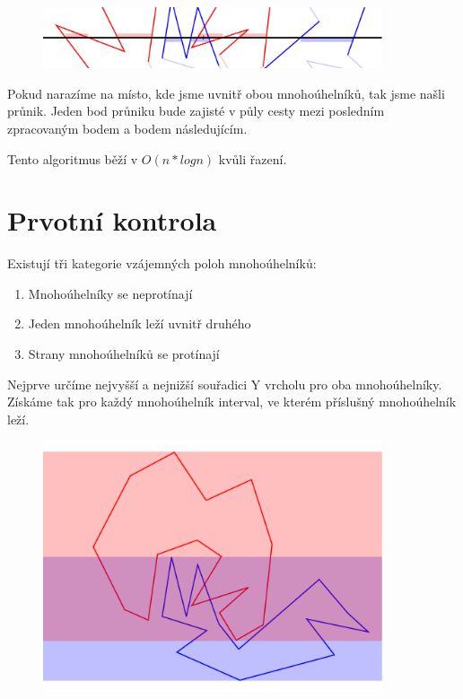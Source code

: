 \documentclass{article}
\begin{document}
\begin{figure}[h] \centering
    \includegraphics[width=10cm]{images/on-line.001.pdf}
\end{figure}

Pokud narazíme na místo, kde jsme uvnitř obou mnohoúhelníků, tak jsme našli průnik. Jeden bod průniku bude zajisté v půly cesty mezi posledním zpracovaným bodem a bodem následujícím.

Tento algoritmus běží v \(O(n * log n)\) kvůli řazení.

\section*{Prvotní kontrola}

Existují tři kategorie vzájemných poloh mnohoúhelníků:

\begin{enumerate}
    \item Mnohoúhelníky se neprotínají
    \item Jeden mnohoúhelník leží uvnitř druhého
    \item Strany mnohoúhelníků se protínají
\end{enumerate}

Nejprve určíme nejvyšší a nejnižší souřadici Y vrcholu pro oba mnohoúhelníky. Získáme tak pro každý mnohoúhelník interval, ve kterém příslušný mnohoúhelník leží.

\begin{figure}[h] \centering
    \includegraphics[width=10cm]{images/interval.pdf}
\end{figure}
\end{document}
